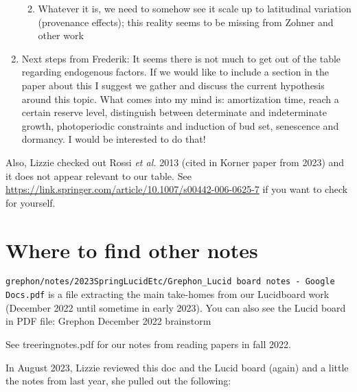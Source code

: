 \documentclass[11pt,letter]{article}
\begin{document}
\begin{enumerate}
\begin{enumerate}
\begin{enumerate}
\end{enumerate}
\item Whatever it is, we need to somehow see it scale up to latitudinal variation (provenance effects); this reality seems to be missing from Zohner and other work
\end{enumerate}
\item Next steps from Frederik: It seems there is not much to get out of the table regarding endogenous factors. If we would like to include a section in the paper about this I suggest we gather and discuss the current hypothesis around this topic. What comes into my mind is: amortization time, reach a certain reserve level, distinguish between determinate and indeterminate growth, photoperiodic constraints and induction of bud set, senescence and dormancy. I would be interested to do that!
\end{enumerate}


Also, Lizzie checked out Rossi \emph{et al.} 2013 (cited in Korner paper from 2023) and it does not appear relevant to our table. See \url{https://link.springer.com/article/10.1007/s00442-006-0625-7} if you want to check for yourself. 


\newpage
\section{Where to find other notes}
\verb|grephon/notes/2023SpringLucidEtc/Grephon_Lucid board notes - Google Docs.pdf|  is a file extracting the main take-homes from our Lucidboard work (December 2022 until sometime in early 2023). You can also see the Lucid board in PDF file: Grephon December 2022 brainstorm

See treeringnotes.pdf for our notes from reading papers in fall 2022. 


In August 2023, Lizzie reviewed this doc and the Lucid board (again) and a little the notes from last year, she pulled out the following:
\end{document}
